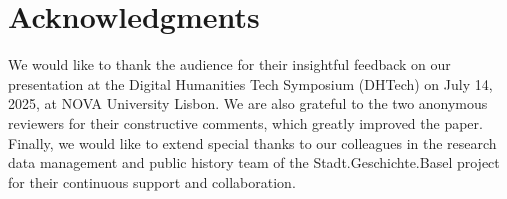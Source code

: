 \documentclass[final]{anthology-ch} %
\begin{document}
\section*{Acknowledgments}

We would like to thank the audience for their insightful feedback on our presentation at the Digital Humanities Tech Symposium (DHTech) on July 14, 2025, at NOVA University Lisbon. We are also grateful to the two anonymous reviewers for their constructive comments, which greatly improved the paper. Finally, we would like to extend special thanks to our colleagues in the research data management and public history team of the Stadt.Geschichte.Basel project for their continuous support and collaboration.

\printbibliography



\end{document}
